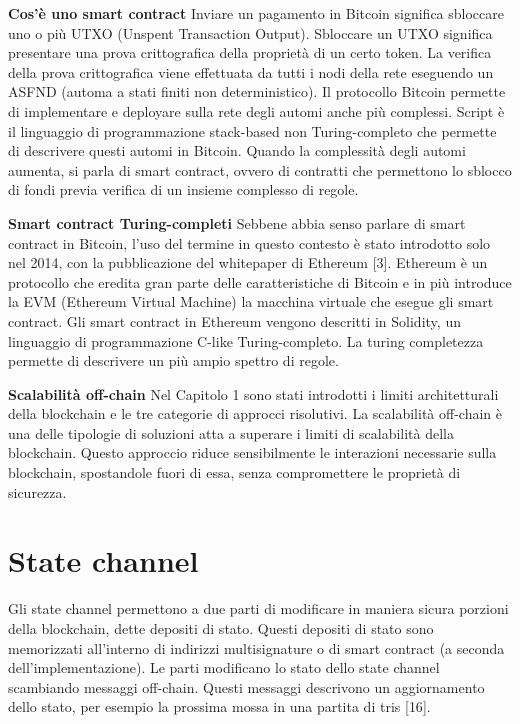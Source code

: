 \documentclass[12pt,italian,]{book}
\begin{document}
\textbf{\textbf{Cos'è uno smart contract}} Inviare un pagamento in Bitcoin significa sbloccare uno o più UTXO (Unspent Transaction Output). Sbloccare un UTXO significa presentare una prova crittografica della proprietà di un certo token. La verifica della prova crittografica viene effettuata da tutti i nodi della rete eseguendo un ASFND (automa a stati finiti non deterministico). Il protocollo Bitcoin permette di implementare e deployare sulla rete degli automi anche più complessi. Script è il linguaggio di programmazione stack-based non Turing-completo che permette di descrivere questi automi in Bitcoin. Quando la complessità degli automi aumenta, si parla di smart contract, ovvero di contratti che permettono lo sblocco di fondi previa verifica di un insieme complesso di regole.

\textbf{\textbf{Smart contract Turing-completi}} Sebbene abbia senso parlare di smart contract in Bitcoin, l'uso del termine in questo contesto è stato introdotto solo nel 2014, con la pubblicazione del whitepaper di Ethereum {[}3{]}. Ethereum è un protocollo che eredita gran parte delle caratteristiche di Bitcoin e in più introduce la EVM (Ethereum Virtual Machine) la macchina virtuale che esegue gli smart contract. Gli smart contract in Ethereum vengono descritti in Solidity, un linguaggio di programmazione C-like Turing-completo. La turing completezza permette di descrivere un più ampio spettro di regole.

\textbf{\textbf{Scalabilità off-chain}} Nel Capitolo 1 sono stati introdotti i limiti architetturali della blockchain e le tre categorie di approcci risolutivi. La scalabilità off-chain è una delle tipologie di soluzioni atta a superare i limiti di scalabilità della blockchain. Questo approccio riduce sensibilmente le interazioni necessarie sulla blockchain, spostandole fuori di essa, senza compromettere le proprietà di sicurezza.

\hypertarget{state-channel}{%
\section{State channel}\label{state-channel}}

Gli state channel permettono a due parti di modificare in maniera sicura porzioni della blockchain, dette depositi di stato. Questi depositi di stato sono memorizzati all'interno di indirizzi multisignature o di smart contract (a seconda dell'implementazione). Le parti modificano lo stato dello state channel scambiando messaggi off-chain. Questi messaggi descrivono un aggiornamento dello stato, per esempio la prossima mossa in una partita di tris {[}16{]}.
\end{document}
